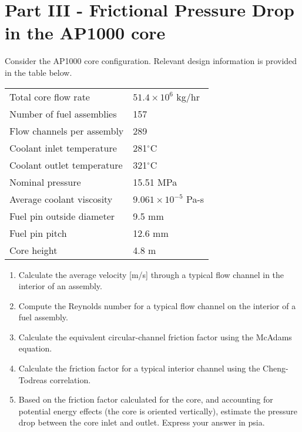 \begin{fullwidth}
\begin{enumerate}[resume]
\end{enumerate}

\pagebreak 

\section{Part III - Frictional Pressure Drop in the AP1000 core}
Consider the AP1000 core configuration.  Relevant design information is provided in the table below.

\begin{table}
\begin{tabular}{ l | l }
\toprule
Total core flow rate & $51.4 \times 10^6$ kg/hr \\
Number of fuel assemblies & 157 \\
Flow channels per assembly & 289 \\
Coolant inlet temperature & 281$^{\circ}$C \\
Coolant outlet temperature & 321$^{\circ}$C \\
Nominal pressure & 15.51 MPa \\
Average coolant viscosity & $9.061 \times 10^{-5}$ Pa-s \\
Fuel pin outside diameter & 9.5 mm \\
Fuel pin pitch & 12.6 mm \\
Core height & 4.8 m \\
\bottomrule
\end{tabular}
\end{table}

\begin{enumerate}[resume]
\item Calculate the average velocity [m/s] through a typical flow channel in the interior of an assembly.

\vspace{1.0 cm}

\item Compute the Reynolds number for a typical flow channel on the interior of a fuel assembly.

\vspace{1.0 cm}

\item Calculate the equivalent circular-channel friction factor using the McAdams equation.

\vspace{1.0 cm}


\item Calculate the friction factor for a typical interior channel using the Cheng-Todreas correlation.

\vspace{1.0 cm}

\item Based on the friction factor calculated for the core, and accounting for potential energy effects (the core is oriented vertically), estimate the pressure drop between the core inlet and outlet.  Express your answer in psia.
\end{enumerate}


\end{fullwidth}
